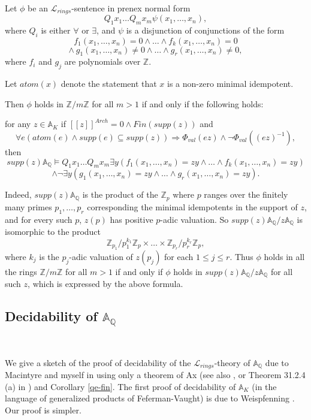 \documentclass[12pt]{amsart}
\def\A{\mathbb{A}}
\def\Z{\mathbb{Z}}
\def\cL{\mathcal{L}}
\def\Q{\mathbb{Q}}
\def\cL{\mathcal{L}}
\numberwithin{equation}{section}
\begin{document}
\

\medskip

Let $\phi$ be an $\cL_{rings}$-sentence in prenex normal form
$$Q_1 x_1 \dots Q_m x_m \psi(x_1,\dots,x_n),$$
where  
$Q_i$ is either $\forall$ or $\exists$, and $\psi$ is a disjunction of conjunctions of the form 
$$f_1(x_1,\dots,x_n)=0\wedge \dots \wedge f_k(x_1,\dots,x_n)=0$$
$$\wedge ~ g_1(x_1,\dots,x_n)\neq 0 \wedge \dots \wedge g_r(x_1,\dots,x_n)\neq 0,$$
where $f_i$ and $g_j$ are polynomials over $\Z$.

Let $atom(x)$ denote the statement that $x$ is a non-zero minimal idempotent. 

Then $\phi$ holds in $\Z/m\Z$ for all $m>1$ if and only if the following holds:

for any $z\in \A_K$ if $[[z]]^{Arch}=0 \wedge Fin(supp(z))$ 
and 
$$\forall e (atom(e) \wedge supp(e) \subseteq supp(z))\Rightarrow \Phi_{val}(ez) \wedge \neg \Phi_{val}((ez)^{-1}),$$
then 
$$supp(z)\A_{\Q} \models Q_1 x_1 \dots Q_m x_m \exists y 
(f_1(x_1,\dots,x_n)=zy\wedge \dots \wedge f_k(x_1,\dots,x_n)=zy)$$
$$\wedge \neg \exists y (g_1(x_1,\dots,x_n)=zy \wedge \dots \wedge g_r(x_1,\dots,x_n)=zy).$$

Indeed, 
$supp(z)\A_{\Q}$ is the product of the $\Z_p$ where $p$ ranges over the finitely many primes $p_1,\dots,p_r$ 
corresponding the minimal idempotents in the support of $z$, and for every such $p$, $z(p)$ has positive $p$-adic valuation. So $supp(z)\A_{\Q}/z\A_{\Q}$ is isomorphic to the product 
$$\Z_{p_1}/p_1^{k_1}\Z_p\times \dots \times \Z_{p_r}/p_r^{k_r}\Z_p,$$
where 
$k_j$ is the $p_j$-adic valuation of $z(p_j)$ for each $1\leq j\leq r$. 
Thus  $\phi$ holds in all the rings $\Z/m\Z$ for all $m>1$ if and only if 
$\phi$ holds in $supp(z)\A_{\Q}/z\A_{\Q}$ for all such $z$, which is expressed by the above formula.

\medskip

\subsection{\bf Decidability of $\A_{\Q}$}\label{ssec-dec} 

\

\medskip

We give a sketch of the proof of decidability of the $\cL_{rings}$-theory of $\A_{\Q}$ 
due to Macintyre and myself in \cite{DM-ad} using only a theorem of Ax \cite{ax} (see also \cite{fs}, or Theorem 31.2.4 (a) in \cite{FJ}) and 
Corollary \ref{qe-fin}. The first proof of decidability of $\A_K$ (in the language of generalized products of Feferman-Vaught) is due to Weispfenning \cite{weisp-hab}. Our proof is simpler.
\end{document}
